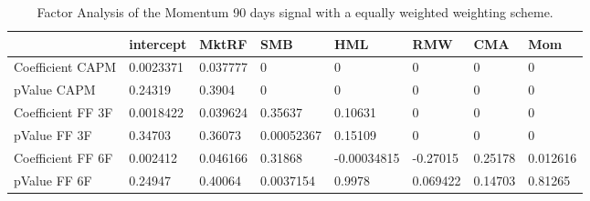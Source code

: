 \begin{table}[H]
\centering
\begin{tabular}{llllllll}
& intercept & MktRF & SMB & HML & RMW & CMA & Mom \\ 
\hline 
Coefficient CAPM & 0.0023371 & 0.037777 & 0 & 0 & 0 & 0 & 0 \\ 
pValue CAPM & 0.24319 & 0.3904 & 0 & 0 & 0 & 0 & 0 \\ 
Coefficient FF 3F & 0.0018422 & 0.039624 & 0.35637 & 0.10631 & 0 & 0 & 0 \\ 
pValue FF 3F & 0.34703 & 0.36073 & 0.00052367 & 0.15109 & 0 & 0 & 0 \\ 
Coefficient FF 6F & 0.002412 & 0.046166 & 0.31868 & -0.00034815 & -0.27015 & 0.25178 & 0.012616 \\ 
pValue FF 6F & 0.24947 & 0.40064 & 0.0037154 & 0.9978 & 0.069422 & 0.14703 & 0.81265 \\ 
\hline
\end{tabular}
\caption{Factor Analysis of the Momentum 90 days signal with a equally weighted weighting scheme.}
\label{MOM90EW_FACTOR}
\end{table}